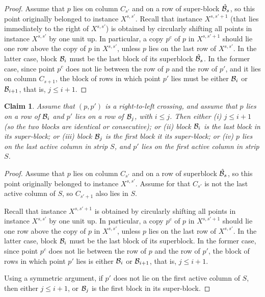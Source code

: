 \documentclass[11pt]{article}
\numberwithin{equation}{section}
\newtheorem{claim}[theorem]{Claim}
\theoremstyle{definition}
\theoremstyle{plain}
\begin{document}
\begin{proof}
Assume that $p$ lies on column $C_{s'}$ and on a row of super-block $\hat{{\mathcal{B}}}_s$, so this point originally belonged to instance $X^{s,s'}$. Recall that instance $X^{s,s'+1}$  (that lies immediately to the right of $X^{s,s'}$) is obtained by circularly shifting all points in instance $X^{s,s'}$ by one unit up. In particular, a copy $p^c$ of $p$ in $X^{s,s'+1}$ should lie one row above the copy of $p$ in $X^{s,s'}$, unless $p$ lies on the last row of $X^{s,s'}$. In the latter case, block ${\mathcal{B}}_i$ must be the last block of its superblock $\hat {{\mathcal{B}}}_s$. In the former case, since point $p^c$ does not lie between the row of $p$ and the row of $p'$, and it lies on column $C_{s+1}$, the block of rows in which point $p'$ lies must be either ${\mathcal{B}}_i$ or ${\mathcal{B}}_{i+1}$, that is, $j\leq i+1$.
\end{proof}

\begin{claim}\label{claim: right to left crossing}
	Assume that $(p,p')$ is a right-to-left crossing, and assume that $p$ lies on a row of ${\mathcal{B}}_i$ and $p'$ lies on a row of ${\mathcal{B}}_j$, with $i\leq j$. Then either (i) $j\leq i+1$ (so the two blocks are identical or consecutive); or (ii) block ${\mathcal{B}}_i$ is the last block in its super-block; or (iii) block ${\mathcal{B}}_j$ is the first block it its super-block; or (iv) $p$ lies on the last active column in strip $S$, and $p'$ lies on the first active column in strip $S$.
\end{claim}

\begin{proof}
	Assume that $p$ lies on column $C_{s'}$ and on a row of superblock $\hat {{\mathcal{B}}}_s$, so this point originally belonged to instance $X^{s,s'}$. 
	Assume for that $C_{s'}$ is not the last active column of $S$, so $C_{s'+1}$ also lies in $S$. 
	
	Recall that instance $X^{s,s'+1}$ is obtained by circularly shifting all points in instance $X^{s,s'}$ by one unit up. In particular, a copy $p^c$ of $p$ in $X^{s,s'+1}$ should lie one row above the copy of $p$ in $X^{s,s'}$, unless $p$ lies on the last row of $X^{s,s'}$. In the latter case, block ${\mathcal{B}}_i$ must be the last block of its superblock. In the former case, since point $p^c$ does not lie between the row of $p$ and the row of $p'$, the block of rows in which point $p'$ lies is either ${\mathcal{B}}_i$ or ${\mathcal{B}}_{i+1}$,  that is, $j\leq i+1$.
	
	Using a symmetric argument, if $p'$ does not lie on the first active column of $S$, then either $j\leq i+1$, or ${\mathcal{B}}_j$ is the first block in its super-block.
\end{proof}
\end{document}
